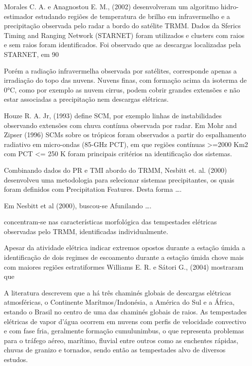 Morales C. A. e Anagnostou E. M., (2002) desenvolveram um algoritmo hidro-estimador estudando regiões de temperatura de brilho em infravermelho e a precipitação observada pelo radar a bordo do satélite TRMM. Dados da Sferics Timing and Ranging Network (STARNET) foram utilizados e clusters com raios e sem raios foram identificados. Foi observado que as descargas localizadas pela STARNET, em 90%

Porém a radiação infravermelha observada por satélites, corresponde apenas a irradiação do topo das nuvens. Nuvens finas, com formação acima da isoterma de 0°C, como por exemplo as nuvem cirrus, podem cobrir grandes extensões e não estar associadas a precipitação nem descargas elétricas.

Houze R. A. Jr, (1993) define SCM, por exemplo linhas de instabilidades observando extensões com chuva contínua observada por radar. Em Mohr and Zipser (1996) SCMs sobre os trópicos foram observados a partir do espalhamento radiativo em micro-ondas (85-GHz PCT), em que regiões contínuas >=2000 Km2 com PCT <= 250 K foram principais critérios na identificação dos sistemas.

Combinando dados do PR e TMI abordo do TRMM, Nesbitt et. al. (2000) desenvolveu uma metodologia para selecionar sistemas precipitantes, os quais foram definidos com Precipitation Features. Desta forma …. 



Em Nesbitt et al (2000), buscou-se 
Afunilando ….

concentram-se nas características morfológica das tempestades elétricas observadas pelo TRMM, identificadas individualmente.

Apesar da atividade elétrica indicar extremos opostos durante a estação úmida 
a identificação de dois regimes de escoamento durante a estação úmida  
chove mais com maiores regiões estratiformes   
Williams E. R. e Sátori G., (2004) mostraram que 


A literatura \cite{} descrevem que a há três chaminés globais de descargas elétricas atmosféricas, o Continente Marítmos/Indonésia, a América do Sul e a África, estando o Brasil no centro de uma das chaminés globais de raios. As tempestades elétricas de vapor d'água ocorrem em nuvens com perfis de velocidade convectivo e com fase fria, geralmente formação cumulunimbus, o que representa problemas para o tráfego aéreo, marítimo, fluvial entre outros como as enchentes rápidas, chuvas de granizo e tornados, sendo então as tempestades  alvo de diversos estudos.


